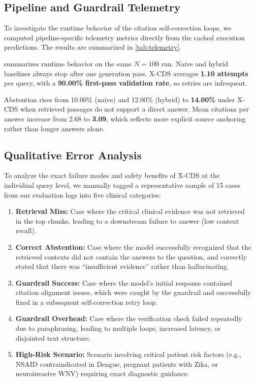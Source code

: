 \subsection{Pipeline and Guardrail Telemetry}
To investigate the runtime behavior of the citation self-correction loops, we computed pipeline-specific telemetry metrics directly from the cached execution predictions. The results are summarized in \cref{tab:telemetry}.



 summarizes runtime behavior on the same $N=100$ run. Naive and hybrid baselines always stop after one generation pass. X-CDS averages \textbf{1.10 attempts} per query, with a \textbf{90.00\% first-pass validation rate}, so retries are infrequent.

Abstention rises from 10.00\% (naive) and 12.00\% (hybrid) to \textbf{14.00\%} under X-CDS when retrieved passages do not support a direct answer. Mean citations per answer increase from 2.68 to \textbf{3.09}, which reflects more explicit source anchoring rather than longer answers alone.

\subsection{Qualitative Error Analysis}
To analyze the exact failure modes and safety benefits of X-CDS at the individual query level, we manually tagged a representative sample of 15 cases from our evaluation logs into five clinical categories:
\begin{enumerate}
    \item \textbf{Retrieval Miss:} Case where the critical clinical evidence was not retrieved in the top chunks, leading to a downstream failure to answer (low context recall).
    \item \textbf{Correct Abstention:} Case where the model successfully recognized that the retrieved contexts did not contain the answers to the question, and correctly stated that there was ``insufficient evidence'' rather than hallucinating.
    \item \textbf{Guardrail Success:} Case where the model's initial response contained citation alignment issues, which were caught by the guardrail and successfully fixed in a subsequent self-correction retry loop.
    \item \textbf{Guardrail Overhead:} Case where the verification check failed repeatedly due to paraphrasing, leading to multiple loops, increased latency, or disjointed text structure.
    \item \textbf{High-Risk Scenario:} Scenario involving critical patient risk factors (e.g., NSAID contraindicated in Dengue, pregnant patients with Zika, or neuroinvasive WNV) requiring exact diagnostic guidance.
\end{enumerate}

